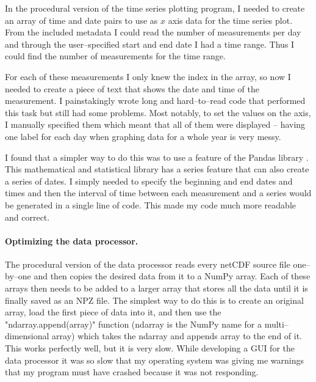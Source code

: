 \documentclass[../00_main.tex]{subfiles}
\begin{document}
In the procedural version of the time 
series plotting program, I needed to create an array of time and date pairs to
use as $x$ axis data for the time series plot. From the included metadata
I could read the number of measurements per day and through the user--specified
start and end date I had a time range. Thus I could find the number of
measurements for the time range.\newline

For each of these measurements I only knew the index in the array, so now I 
needed to create a piece of text that shows the date and time of the 
measurement. I painstakingly wrote long and hard--to--read code that performed 
this task but still had some problems. Most notably, to set the values on the 
axis, I manually specified them which meant that all of them were displayed -- 
having one label for each day when graphing data for a whole year is very 
messy.\newline

I found that a simpler way to do this was to use a feature of the Pandas 
library \cite{pandas}. This mathematical and statistical library has
a series feature that can also create a series of dates. I simply needed to
specify the beginning and end dates and times and then the interval of time
between each measurement and a series would be generated in a single line of
code. This made my code much more readable and correct. 

\paragraph{Optimizing the data processor.} 

The procedural version of the data processor reads every netCDF source file 
one--by--one and then copies the desired data from it to a NumPy array. Each of 
these arrays then needs to be added to a larger array that stores all the data 
until it is finally saved as an NPZ file. The simplest way to do this is to 
create an original array, load the first piece of data into it, and then use 
the "ndarray.append(array)" function (ndarray is the NumPy name for a 
multi--dimensional array) which takes the ndarray and appends array to the end 
of it. This works perfectly well, but it is very slow. While developing a GUI 
for the data processor it was so slow that my operating system was giving me
warnings that my program must have crashed because it was not
responding.\newline
\end{document}
